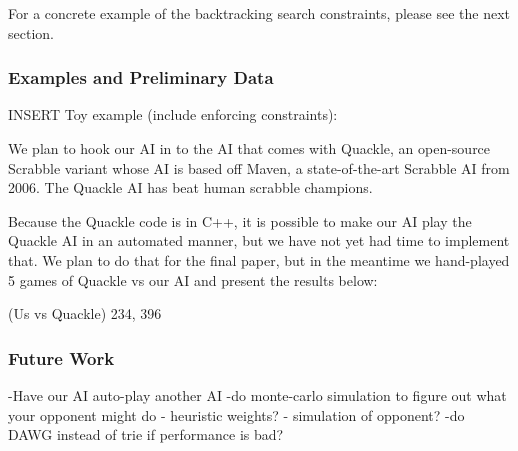 \documentclass[12pt]{article}
\begin{document}


For a concrete example of the backtracking search constraints, please
see the next section.

\subsubsection*{Examples and Preliminary Data}
INSERT Toy example (include enforcing constraints):

We plan to hook our AI in to the AI that comes with Quackle, an
open-source Scrabble variant whose AI is based off Maven, a
state-of-the-art Scrabble AI from 2006. The Quackle AI has beat human
scrabble champions.

Because the Quackle code is in C++, it is possible to make our AI play
the Quackle AI in an automated manner, but we have not yet had time to
implement that. We plan to do that for the final paper, but in the
meantime we hand-played 5 games of Quackle vs our AI and present the
results below:

(Us vs Quackle)
234, 396


\subsubsection*{Future Work}
-Have our AI auto-play another AI
-do monte-carlo simulation to figure out what your opponent might do
- heuristic weights?
- simulation of opponent? 
-do DAWG instead of trie if performance is bad?
\end{document}
